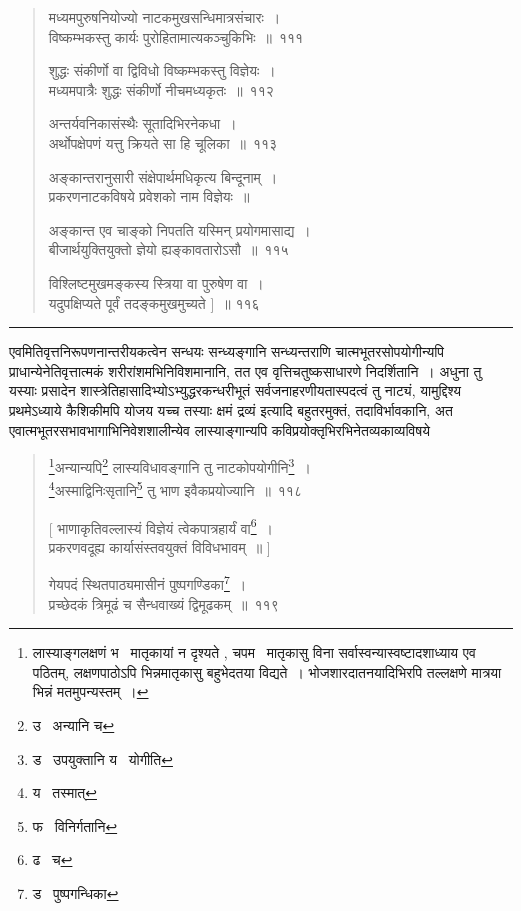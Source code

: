 \documentclass[11pt, openany]{book}
\begin{document}
\begin{quote}
{\na मध्यमपुरुषनियोज्यो नाटकमुखसन्धिमात्रसंचारः~।\\
विष्कम्भकस्तु कार्यः पुरोहितामात्यकञ्चुकिभिः~॥~१११

शुद्धः संकीर्णो वा द्विविधो विष्कम्भकस्तु विज्ञेयः~।\\
मध्यमपात्रैः शुद्धः संकीर्णो नीचमध्यकृतः~॥~११२

अन्तर्यवनिकासंस्थैः सूतादिभिरनेकधा~।\\
अर्थोपक्षेपणं यत्तु क्रियते सा हि चूलिका~॥~११३

अङ्कान्तरानुसारी संक्षेपार्थमधिकृत्य बिन्दूनाम्~।\\
प्रकरणनाटकविषये प्रवेशको नाम विज्ञेयः~॥

अङ्कान्त एव चाङ्को निपतति यस्मिन् प्रयोगमासाद्य~।\\
बीजार्थयुक्तियुक्तो ज्ञेयो ह्यङ्कावतारोऽसौ~॥~११५

विश्लिष्टमुखमङ्कस्य स्त्रिया वा पुरुषेण वा~।\\
यदुपक्षिप्यते पूर्वं तदङ्कमुखमुच्यते ]~॥ ११६}
\end{quote}

\hrule

\vspace{2mm}
एवमितिवृत्तनिरूपणनान्तरीयकत्वेन सन्धयः सन्ध्यङ्गानि सन्ध्यन्तराणि चात्मभूतरसोपयोगीन्यपि प्राधान्येनेतिवृत्तात्मकं शरीरांशमभिनिविशमानानि, तत एव वृत्तिचतुष्कसाधारणे निदर्शितानि~। अधुना तु यस्याः प्रसादेन शास्त्रेतिहासादिभ्योऽभ्युद्धरकन्धरीभूतं सर्वजनाहरणीयतास्पदत्वं तु नाट्यं, यामुद्दिश्य प्रथमेऽध्याये {\qt कैशिकीमपि योजय यच्च तस्याः क्षमं द्रव्यं} इत्यादि बहुतरमुक्तं, तदाविर्भावकानि, अत एवात्मभूतरसभावभागाभिनिवेशशालीन्येव लास्याङ्गान्यपि कविप्रयोक्तृभिरभिनेतव्यकाव्यविषये


\newpage
\lfoot{}

\begin{quote}
{\na \renewcommand{\thefootnote}{*}\footnote{लास्याङ्गलक्षणं भ \textendash\ मातृकायां न दृश्यते , चपम \textendash\ मातृकासु विना सर्वास्वन्यास्वष्टादशाध्याय एव पठितम्, लक्षणपाठोऽपि भिन्नमातृकासु बहुभेदतया विद्यते~। भोजशारदातनयादिभिरपि तल्लक्षणे मात्रया भिन्नं मतमुपन्यस्तम्~।}अन्यान्यपि\renewcommand{\thefootnote}{1}\footnote{उ \textendash\ अन्यानि च} लास्यविधावङ्गानि तु नाटकोपयोगीनि\renewcommand{\thefootnote}{2}\footnote{ड \textendash\ उपयुक्तानि य \textendash\ योगीति}~।\\
\renewcommand{\thefootnote}{3}\footnote{य \textendash\ तस्मात्}अस्माद्विनिःसृतानि\renewcommand{\thefootnote}{4}\footnote{फ \textendash\ विनिर्गतानि} तु भाण इवैकप्रयोज्यानि~॥~११८

[ भाणाकृतिवल्लास्यं विज्ञेयं त्वेकपात्रहार्यं वा\renewcommand{\thefootnote}{5}\footnote{ढ \textendash\ च}~।\\
प्रकरणवदूह्य कार्यासंस्तवयुक्तं विविधभावम्~॥ ]

गेयपदं स्थितपाठ्यमासीनं पुष्पगण्डिका\renewcommand{\thefootnote}{6}\footnote{ड \textendash\ पुष्पगन्धिका}~।\\
प्रच्छेदकं त्रिमूढं च सैन्धवाख्यं द्विमूढकम्~॥~११९}
\end{quote}
\end{document}
